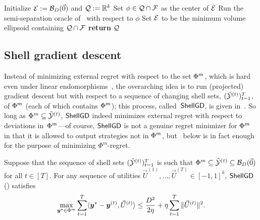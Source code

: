 \begin{algorithm}[!ht]
\caption{$\shellelips(\cF)$}
\label{alg:shellellipsoid}
Initialize ${\mathcal{E}} := {\mathcal{B}}_D(\vec{0})$ and ${\mathcal{Q}} := \mathbb R^k$\;
 \While{$\vol(\cE) \geq \epsilon$} {
    Set $\phi \in {\mathcal{Q}} \cap {\mathcal{F}}$ as the center of ${\mathcal{E}}$\;
    Run the semi-separation oracle of~ with respect to $\phi$\;
    Set ${\mathcal{E}}$ to be the minimum volume ellipsoid containing ${\mathcal{Q}} \cap {\mathcal{F}}$
 }
 \textbf{return} ${\mathcal{Q}}$
\end{algorithm}

\subsection{Shell gradient descent}
\label{sec:shellgd}

Instead of minimizing external regret with respect to the set $\Phi^m$, which is hard even under linear endomorphisms~\citep{Daskalakis24:Efficient}, the overarching idea is to run (projected) gradient descent but with respect to a sequence of changing shell sets, $(\tilde{{\mathcal{Y}}}^{(t)})_{t=1}^T$, of $\Phi^m$ (each of which contains $\Phi^m$); this process, called~$\textsf{ShellGD}$, is given in~. So long as $\Phi^m \subseteq \tilde{{\mathcal{Y}}}^{(t)}$, $\textsf{ShellGD}$ indeed minimizes external regret with respect to deviations in~$\Phi^m$---of course, $\textsf{ShellGD}$ is not a genuine regret minimizer for $\Phi^m$ in that it is allowed to output strategies not in $\Phi^m$, but~ below is in fact enough for the purpose of minimizing $\Phi^m$-regret.

\begin{lemma}
    \label{lemma:shellgd}
    Suppose that the sequence of shell sets $(\tilde{{\mathcal{Y}}}^{(t)})_{t=1}^T$ is such that $\Phi^m \subseteq \tilde{{\mathcal{Y}}}^{(t)} \subseteq {\mathcal{B}}_D(\vec{0})$ for all $t \in [T]$. For any sequence of utilities $\vec{U}^{(1)}, \dots, \vec{U}^{(T)} \in [-1, 1]^k$, $\textsf{ShellGD}$ () satisfies
    \begin{equation}
        \max_{{\bm{y}}^* \in \Phi^m} \sum_{t=1}^T \langle {\bm{y}}^* - {\bm{y}}^{(t)}, \vec{U}^{(t)} \rangle \leq \frac{D^2}{2\eta} + \eta \sum_{t=1}^T \| \vec{U}^{(t)} \|^2.
    \end{equation}
\end{lemma}

